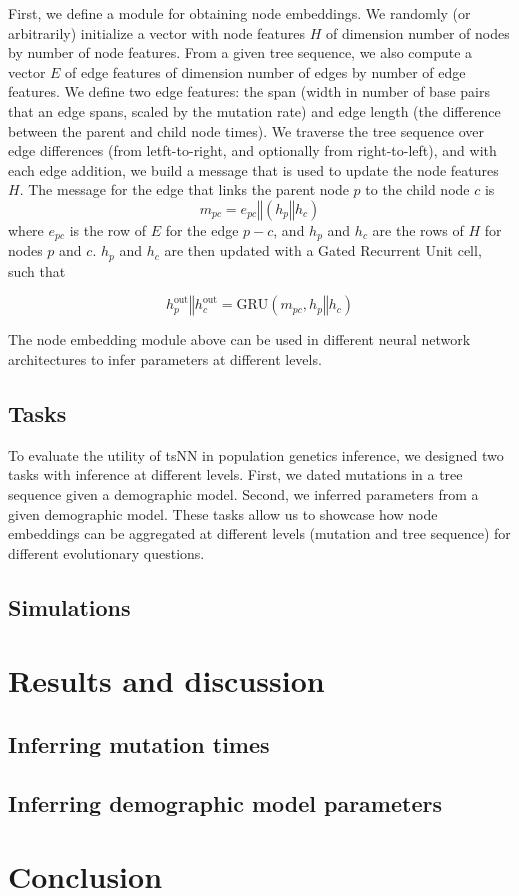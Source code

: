 First, we define a module for obtaining node embeddings.
We randomly (or arbitrarily) initialize a vector with node features $H$ of dimension number of nodes by number of node features.
From a given tree sequence, we also compute a vector $E$ of edge features of dimension number of edges by number of edge features.
We define two edge features: the span (width in number of base pairs that an edge spans, scaled by the mutation rate) and edge length (the difference between the parent and child node times).
We traverse the tree sequence over edge differences (from letft-to-right, and optionally from right-to-left), and
with each edge addition, we build a message that is used to update the node features $H$.
The message for the edge that links the parent node $p$ to the child node $c$ is 
$$ m_{pc} = e_{pc} \mathbin\Vert (h_p \mathbin\Vert h_c)$$
where $e_{pc}$ is the row of $E$ for the edge $p-c$, and $h_p$ and $h_c$ are the rows of $H$ for nodes $p$ and $c$.
$h_p$ and $h_c$ are then updated with a Gated Recurrent Unit cell, such that

$$ h^{\mathrm{out}}_p \mathbin\Vert h^{\mathrm{out}}_c = \mathrm{GRU}(m_{pc}, h_p \mathbin\Vert h_c)$$

The node embedding module above can be used in different neural network architectures to infer parameters at different levels.




\subsection{Tasks}
To evaluate the utility of tsNN in population genetics inference, we designed two tasks with inference at different levels.
First, we dated mutations in a tree sequence given a demographic model.
Second, we inferred parameters from a given demographic model.
These tasks allow us to showcase how node embeddings can be aggregated at different levels (mutation and tree sequence) for different evolutionary questions.

\subsection{Simulations}



\section{Results and discussion}

\subsection{Inferring mutation times}

\subsection{Inferring demographic model parameters}

\section{Conclusion}
